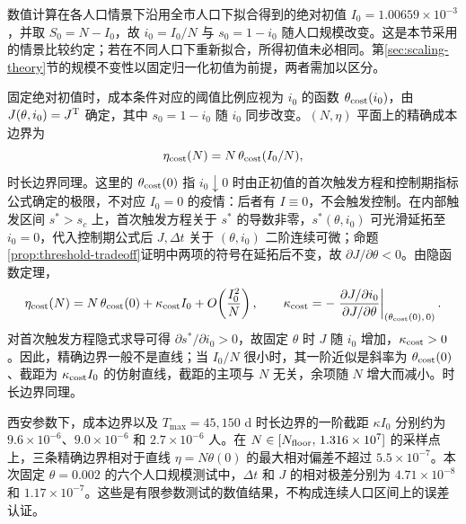 

数值计算在各人口情景下沿用全市人口下拟合得到的绝对初值 $I_0=1.00659\times10^{-3}$，并取 $S_0=N-I_0$，故 $i_0=I_0/N$ 与 $s_0=1-i_0$ 随人口规模改变。这是本节采用的情景比较约定；若在不同人口下重新拟合，所得初值未必相同。第\ref{sec:scaling-theory}节的规模不变性以固定归一化初值为前提，两者需加以区分。

固定绝对初值时，成本条件对应的阈值比例应视为 $i_0$ 的函数 $\theta_{\rm cost}(i_0)$，由 $J(\theta,i_0)=J^{\rm T}$ 确定，其中 $s_0=1-i_0$ 随 $i_0$ 同步改变。$(N,\eta)$ 平面上的精确成本边界为
\[
\eta_{\rm cost}(N)=N\,\theta_{\rm cost}(I_0/N),
\]
时长边界同理。这里的 $\theta_{\rm cost}(0)$ 指 $i_0\downarrow0$ 时由正初值的首次触发方程和控制期指标公式确定的极限，不对应 $I_0=0$ 的疫情：后者有 $I\equiv0$，不会触发控制。在内部触发区间 $s^*>s_c$ 上，首次触发方程关于 $s^*$ 的导数非零，$s^*(\theta,i_0)$ 可光滑延拓至 $i_0=0$，代入控制期公式后 $J,\Delta t$ 关于 $(\theta,i_0)$ 二阶连续可微；命题\ref{prop:threshold-tradeoff}证明中两项的符号在延拓后不变，故 $\partial J/\partial\theta<0$。由隐函数定理，
\[
\eta_{\rm cost}(N)=N\,\theta_{\rm cost}(0)+\kappa_{\rm cost}I_0+O\!\left(\frac{I_0^2}{N}\right),
\qquad
\kappa_{\rm cost}=-\left.\frac{\partial J/\partial i_0}{\partial J/\partial\theta}\right|_{(\theta_{\rm cost}(0),\,0)}.
\]
对首次触发方程隐式求导可得 $\partial s^*/\partial i_0>0$，故固定 $\theta$ 时 $J$ 随 $i_0$ 增加，$\kappa_{\rm cost}>0$。因此，精确边界一般不是直线；当 $I_0/N$ 很小时，其一阶近似是斜率为 $\theta_{\rm cost}(0)$、截距为 $\kappa_{\rm cost}I_0$ 的仿射直线，截距的主项与 $N$ 无关，余项随 $N$ 增大而减小。时长边界同理。

西安参数下，成本边界以及 $T_{\max}=45,150$ d 时长边界的一阶截距 $\kappa I_0$ 分别约为 $9.6\times10^{-6}$、$9.0\times10^{-6}$ 和 $2.7\times10^{-6}$ 人。在 $N\in[N_{\rm floor},\,1.316\times10^7]$ 的采样点上，三条精确边界相对于直线 $\eta=N\theta(0)$ 的最大相对偏差不超过 $5.5\times10^{-7}$。本次固定 $\theta=0.002$ 的六个人口规模测试中，$\Delta t$ 和 $J$ 的相对极差分别为 $4.71\times10^{-8}$ 和 $1.17\times10^{-7}$。这些是有限参数测试的数值结果，不构成连续人口区间上的误差认证。


